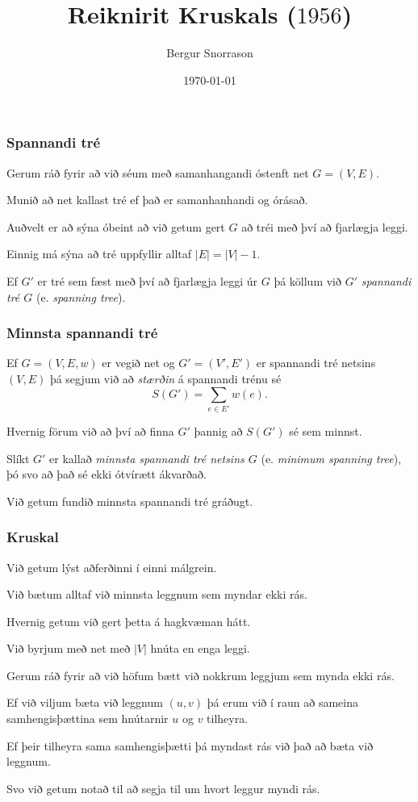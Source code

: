 \title{Reiknirit Kruskals ($1956$)}
\author{Bergur Snorrason}
\date{\today}



\frame{\titlepage}

{
	\frametitle{Spannandi tré}
	{
		\item<1-> Gerum ráð fyrir að við séum með samanhangandi óstenft net $G = (V, E)$.
		\item<2-> Munið að net kallast tré ef það er samanhanhandi og órásað.
		\item<3-> Auðvelt er að sýna óbeint að við getum gert $G$ að tréi með því að fjarlægja leggi.
		\item<4-> Einnig má sýna að tré uppfyllir alltaf $|E| = |V| - 1$.
		\item<5-> Ef $G'$ er tré sem fæst með því að fjarlægja leggi úr $G$ þá köllum við $G'$ \emph{spannandi tré $G$} (e. \emph{spanning tree}).
	}
}

{
	\frametitle{Minnsta spannandi tré}
	{
		\item<1-> Ef $G = (V, E, w)$ er vegið net og $G' = (V', E')$ er spannandi tré netsins $(V, E)$ þá segjum við að \emph{stærðin}
					á spannandi trénu sé
		\[
			S(G') = \sum_{e \in E'} w(e).
		\]
		\item<2-> Hvernig förum við að því að finna $G'$ þannig að $S(G')$ sé sem minnst.
		\item<3-> Slíkt $G'$ er kallað \emph{minnsta spannandi tré netsins $G$} (e. \emph{minimum spanning tree}),
					þó svo að það sé ekki ótvírætt ákvarðað.
		\item<4-> Við getum fundið minnsta spannandi tré gráðugt.
	}
}

{
	\frametitle{Kruskal}
	{
		\item<1-> Við getum lýst aðferðinni í einni málgrein.
		\item<2-> Við bætum alltaf við minnsta leggnum sem myndar ekki rás.
		\item<3-> Hvernig getum við gert þetta á hagkvæman hátt.
		\item<4-> Við byrjum með net með $|V|$ hnúta en enga leggi.
		\item<5-> Gerum ráð fyrir að við höfum bætt við nokkrum leggjum sem mynda ekki rás.
		\item<6-> Ef við viljum bæta við leggnum $(u, v)$ þá erum við í raun að sameina samhengisþættina sem hnútarnir $u$ og $v$ tilheyra.
		\item<7-> Ef þeir tilheyra sama samhengisþætti þá myndast rás við það að bæta við leggnum.
		\item<8-> Svo við getum notað  til að segja til um hvort leggur myndi rás.
	}
}

